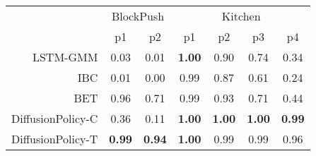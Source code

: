 


\setlength\tabcolsep{4.8 pt}
\begin{tabular}{r|cc|cccc}
\toprule
 & \multicolumn{2}{c|}{BlockPush} & \multicolumn{4}{c}{Kitchen} \\
 & p1 & p2 & p1 & p2 & p3 & p4 \\
\midrule
LSTM-GMM & \small 0.03 & \small 0.01 & \small \textbf{1.00} & \small 0.90 & \small 0.74 & \small 0.34 \\
IBC & \small 0.01 & \small 0.00 & \small 0.99 & \small 0.87 & \small 0.61 & \small 0.24 \\
BET & \small 0.96 & \small 0.71 & \small 0.99 & \small 0.93 & \small 0.71 & \small 0.44 \\
DiffusionPolicy-C & \small 0.36 & \small 0.11 & \small \textbf{1.00} & \small \textbf{1.00} & \small \textbf{1.00} & \small \textbf{0.99} \\
DiffusionPolicy-T & \small \textbf{0.99} & \small \textbf{0.94} & \small \textbf{1.00} & \small 0.99 & \small 0.99 & \small 0.96 \\
\bottomrule
\end{tabular}
